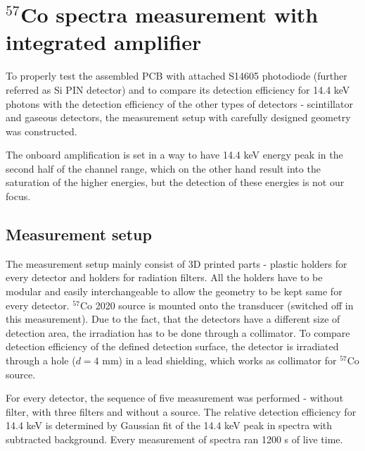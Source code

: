\chapter{$^{57}$Co spectra measurement with integrated amplifier} 

To properly test the assembled PCB with attached S14605 photodiode (further referred as Si PIN detector) and to compare its detection efficiency for 14.4 keV photons with the detection efficiency of the other types of detectors - scintillator and gaseous detectors, the measurement setup with carefully designed geometry was constructed.

%

\par

The onboard amplification is set in a way to have 14.4 keV energy peak in the second half of the channel range, which on the other hand result into the saturation of the higher energies, but the detection of these energies is not our focus.



\section{Measurement setup}
The measurement setup mainly consist of 3D printed parts - plastic holders for every detector and holders for radiation filters. All the holders have to be modular and easily interchangeable to allow the geometry to be kept same for every detector.
$^{57}$Co 2020 source is mounted onto the transducer (switched off in this measurement). Due to the fact, that the detectors have a different size of detection area, the irradiation has to be done through a collimator. To compare detection efficiency of the defined detection surface, the detector is irradiated through a hole ($d = 4$ mm) in a lead shielding, which works as collimator for $^{57}$Co source.

\par
For every detector, the sequence of five measurement was performed - without filter, with three filters and without a source. The relative detection efficiency for 14.4 keV is determined by Gaussian fit of the 14.4 keV peak in spectra with subtracted background. Every measurement of spectra ran 1200 s of live time.


